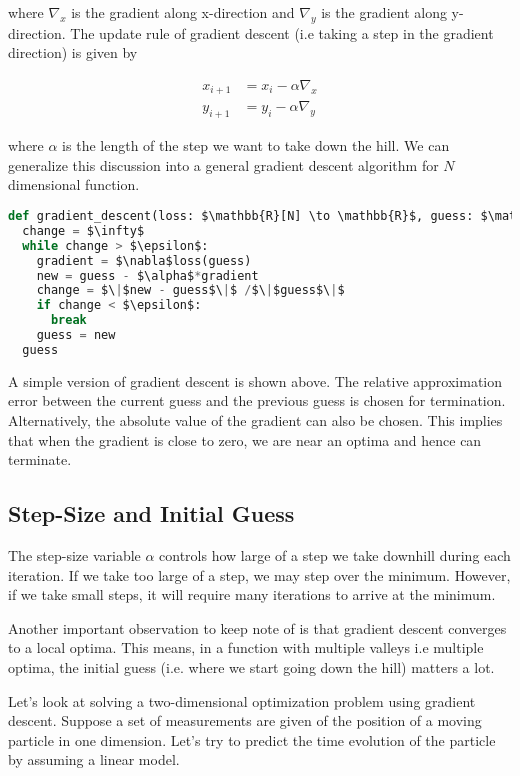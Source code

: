 \documentclass[book.tex]{subfiles}
\begin{document}
where $\nabla_x$ is the gradient along x-direction and $\nabla_y$ is the gradient along y-direction. The update rule of gradient descent (i.e taking a step in the gradient direction) is given by
	
\begin{align}
x_{i+1} &= x_{i} - \alpha \nabla_x\\
y_{i+1} &= y_{i} - \alpha \nabla_y
\end{align}
	
where $\alpha$ is the length of the step we want to take down the hill. We can generalize this discussion into a general gradient descent algorithm for $N$ dimensional function.
	
\begin{lstlisting}[language=python]
def gradient_descent(loss: $\mathbb{R}[N] \to \mathbb{R}$, guess: $\mathbb{R}[N]$, $\alpha$ : $\mathbb{R}$, $\epsilon$: $\mathbb{R}$) $\to$ $\mathbb{R}$[N]:
  change = $\infty$
  while change > $\epsilon$:
    gradient = $\nabla$loss(guess)
    new = guess - $\alpha$*gradient
    change = $\|$new - guess$\|$ /$\|$guess$\|$
    if change < $\epsilon$:
      break
    guess = new
  guess
\end{lstlisting}

A simple version of gradient descent is shown above. The relative approximation error between the current guess and the previous guess is chosen for termination. Alternatively, the absolute value of the gradient can also be chosen. This implies that when the gradient is close to zero, we are near an optima and hence can terminate.
	
	
\subsection{Step-Size and Initial Guess}
The step-size variable $\alpha$ controls how large of a step we take downhill during each iteration. If we take too large of a step, we may step over the minimum. However, if we take small steps, it will require many iterations to arrive at the minimum.
	
Another important observation to keep note of is that gradient descent converges to a local optima. This means, in a function with multiple valleys i.e multiple optima, the initial guess (i.e. where we start going down the hill) matters a lot. 
	
Let's look at solving a two-dimensional optimization problem using gradient descent. Suppose a set of measurements are given of the position of a moving particle in one dimension. Let's try to predict the time evolution of the particle by assuming a linear model.
\end{document}
